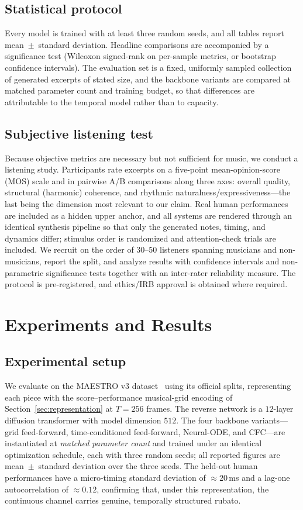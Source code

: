 \documentclass[review]{elsarticle}
\begin{document}
\subsection{Statistical protocol}
Every model is trained with at least three random seeds, and all tables report
mean~$\pm$~standard deviation. Headline comparisons are accompanied by a significance test
(Wilcoxon signed-rank on per-sample metrics, or bootstrap confidence intervals). The
evaluation set is a fixed, uniformly sampled collection of generated excerpts of stated
size, and the backbone variants are compared at matched parameter count and training budget,
so that differences are attributable to the temporal model rather than to capacity.

\subsection{Subjective listening test}
Because objective metrics are necessary but not sufficient for music, we conduct a listening
study. Participants rate excerpts on a five-point mean-opinion-score (MOS) scale and in
pairwise A/B comparisons along three axes: overall quality, structural (harmonic) coherence,
and rhythmic naturalness/expressiveness---the last being the dimension most relevant to our
claim. Real human performances are included as a hidden upper anchor, and all systems are
rendered through an identical synthesis pipeline so that only the generated notes, timing,
and dynamics differ; stimulus order is randomized and attention-check trials are included.
We recruit on the order of 30--50 listeners spanning musicians and non-musicians, report the
split, and analyze results with confidence intervals and non-parametric significance tests
together with an inter-rater reliability measure. The protocol is pre-registered, and
ethics/IRB approval is obtained where required.

\section{Experiments and Results}
\label{sec:results}

\subsection{Experimental setup}
We evaluate on the MAESTRO v3 dataset~\cite{hawthorne2019maestro} using its official
splits, representing each piece with the score--performance musical-grid encoding of
Section~\ref{sec:representation} at $T=256$ frames. The reverse network is a $12$-layer
diffusion transformer with model dimension $512$. The four backbone variants---grid
feed-forward, time-conditioned feed-forward, Neural-ODE, and CFC---are instantiated at
\emph{matched parameter count} and trained under an identical optimization schedule, each
with three random seeds; all reported figures are mean~$\pm$~standard deviation over the
three seeds. The held-out human performances have a micro-timing standard deviation of
$\approx\!20$\,ms and a lag-one autocorrelation of $\approx\!0.12$, confirming that, under
this representation, the continuous channel carries genuine, temporally structured rubato.
\end{document}
